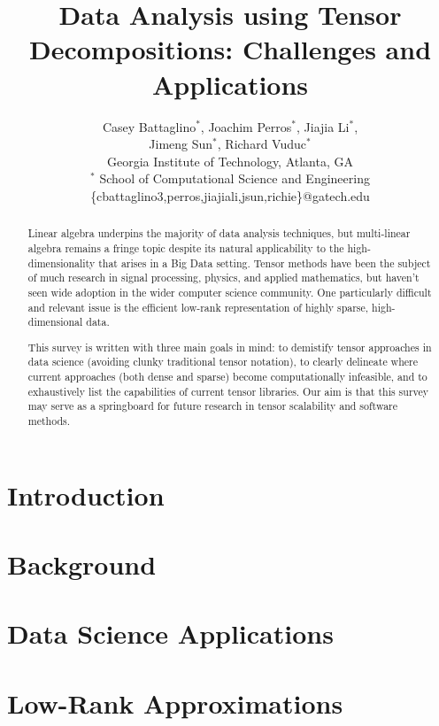 \documentclass[leqno,onefignum,onetabnum,twocolumn]{siamltex1213}
\title{Data Analysis using Tensor Decompositions: Challenges and Applications}
\author{
  Casey Battaglino$^\ast$, Joachim Perros$^\ast$, Jiajia Li$^\ast$, \\
   Jimeng Sun$^\ast$, Richard Vuduc$^\ast$
  \\ Georgia Institute of Technology, Atlanta, GA
  \\ $^\ast$ School of Computational Science and Engineering \\
  \{cbattaglino3,perros,jiajiali,jsun,richie\}@gatech.edu } \date{}
\begin{document}

\maketitle

\begin{abstract}
Linear algebra underpins the majority of data analysis techniques, but multi-linear algebra remains a fringe topic despite its natural applicability to the high-dimensionality that arises in a Big Data setting. Tensor methods have been the subject of much research in signal processing, physics, and applied mathematics, but haven't seen wide adoption in the wider computer science community. One particularly difficult and relevant issue is the efficient low-rank representation of highly sparse, high-dimensional data.

This survey is written with three main goals in mind: to demistify tensor approaches in data science (avoiding clunky traditional tensor notation), to clearly delineate where current approaches (both dense and sparse) become computationally infeasible, and to exhaustively list the capabilities of current tensor libraries. Our aim is that this survey may serve as a springboard for future research in tensor scalability and software methods. 
\end{abstract}

\section{Introduction} \label{sec:intro}


\section{Background} \label{sec:background}


\section{Data Science Applications}

\section{Low-Rank Approximations}

\end{document}
